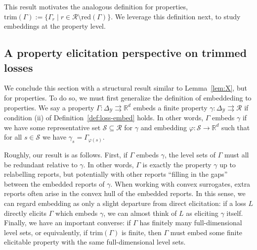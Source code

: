 \documentclass[twoside,11pt]{article}
\newcommand{\reals}{\mathbb{R}}
\newcommand{\simplex}{\Delta_\Y}
\newcommand{\R}{\mathcal{R}}
\newcommand{\Sc}{\mathcal{S}}
\newcommand{\Y}{\mathcal{Y}}
\newcommand{\toto}{\rightrightarrows}
\newcommand{\red}{\mathrm{red}}
\newcommand{\trimred}{\mathrm{trim}}
\begin{document}
This result motivates the analogous definition for properties, $\trimred(\Gamma) := \{\Gamma_r \mid r \in \R\setminus\red(\Gamma)\}$.
We leverage this definition next, to study embeddings at the property level.

\subsection{A property elicitation perspective on trimmed losses}
\label{sec:prop-trim}

We conclude this section with a structural result similar to Lemma~\ref{lem:X}, but for properties.
To do so, we must first generalize the definition of embeddeding to properties.
We say a property $\Gamma:\simplex\toto\reals^d$ embeds a finite property $\gamma:\simplex\toto\R$ if condition (ii) of Definition~\ref{def:loss-embed} holds.
In other words, $\Gamma$ embeds $\gamma$ if we have some representative set $\Sc\subseteq\R$ for $\gamma$ and embedding $\varphi:\Sc\to\reals^d$ such that for all $s\in\Sc$ we have $\gamma_s = \Gamma_{\varphi(s)}$.

Roughly, our result is as follows.
First, if $\Gamma$ embeds $\gamma$, the level sets of $\Gamma$ must all be redundant relative to $\gamma$.
In other words, $\Gamma$ is exactly the property $\gamma$ up to relabelling reports, but potentially with other reports ``filling in the gaps'' between the embedded reports of $\gamma$.
When working with convex surrogates, extra reports often arise in the convex hull of the embedded reports.
In this sense, we can regard embedding as only a slight departure from direct elicitation: if a loss $L$ directly elicits $\Gamma$ which embeds $\gamma$, we can almost think of $L$ as eliciting $\gamma$ itself.
Finally, we have an important converse: if $\Gamma$ has finitely many full-dimensional level sets, or equivalently, if $\trimred(\Gamma)$ is finite, then $\Gamma$ must embed some finite elicitable property with the same full-dimensional level sets.
\end{document}
